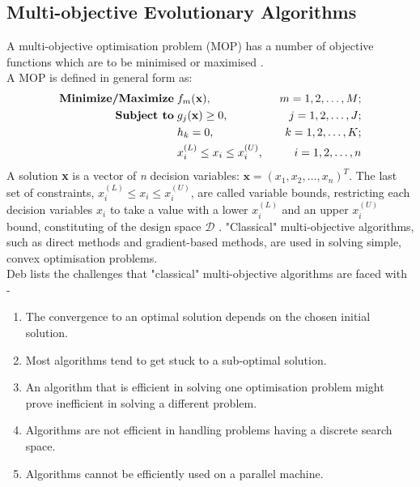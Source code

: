 \documentclass[sigconf, nonacm, preprint]{acmart}
\begin{document}
\subsection{Multi-objective Evolutionary Algorithms}
A multi-objective optimisation problem (MOP) has a number of objective functions which are to be minimised or maximised \cite{deb2001}.\\ A MOP is defined in general form as:
\begin{align*}
	\textbf{Minimize/Maximize} \hspace{0.1cm}
    & f_m(\textbf{x}), \hspace{0.2cm}
    & m = 1, 2, \ldots, M; \\
    \textbf{Subject to} \hspace{0.1cm}
    & g_{j}(\textbf{x}) \ge 0, \hspace{0.2cm}
    & j = 1, 2, \ldots, J; \\
    & h_{k} = 0, \hspace{0.2cm}
    & k = 1, 2, \ldots, K; \\
    & x_{i}^{(L)} \le x_{i} \le x_{i}^{(U)}, \hspace{0.2cm}
    & i = 1, 2, \ldots, n
\end{align*}
A solution \textbf{x} is a vector of \textit{n} decision variables: $\textbf{x} = (x_{1}, x_{2}, \ldots, x_{n})^{T}$. The last set of constraints, $x_{i}^{(L)} \le x_{i} \le x_{i}^{(U)}$, are called variable bounds, restricting each decision variables $x_{i}$ to take a value with a lower $x_{i}^{(L)}$ and an upper $x_{i}^{(U)}$ bound, constituting of the design space $\mathcal{D}$ \cite{deb2002}. "Classical" multi-objective algorithms, such as direct methods and gradient-based methods, are used in solving simple, convex optimisation problems.\\
Deb \cite{deb2002} lists the challenges that "classical" multi-objective algorithms are faced with -
\begin{enumerate}
\item The convergence to an optimal solution depends on the chosen initial solution.
\item Most algorithms tend to get stuck to a sub-optimal solution.
\item An algorithm that is efficient in solving one optimisation problem might prove inefficient in solving a different problem.
\item Algorithms are not efficient in handling problems having a discrete search space.
\item Algorithms cannot be efficiently used on a parallel machine.
\end{enumerate}
\end{document}
